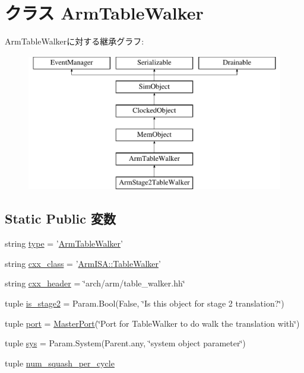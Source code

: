 \hypertarget{classArmTLB_1_1ArmTableWalker}{
\section{クラス ArmTableWalker}
\label{classArmTLB_1_1ArmTableWalker}
}
ArmTableWalkerに対する継承グラフ:\begin{figure}[H]
\begin{center}
\leavevmode
\includegraphics[height=6cm]{classArmTLB_1_1ArmTableWalker}
\end{center}
\end{figure}
\subsection*{Static Public 変数}
\begin{DoxyCompactItemize}
\item 
string \hyperlink{classArmTLB_1_1ArmTableWalker_acce15679d830831b0bbe8ebc2a60b2ca}{type} = '\hyperlink{classArmTLB_1_1ArmTableWalker}{ArmTableWalker}'
\item 
string \hyperlink{classArmTLB_1_1ArmTableWalker_a58cd55cd4023648e138237cfc0822ae3}{cxx\_\-class} = '\hyperlink{classArmISA_1_1TableWalker}{ArmISA::TableWalker}'
\item 
string \hyperlink{classArmTLB_1_1ArmTableWalker_a17da7064bc5c518791f0c891eff05fda}{cxx\_\-header} = \char`\"{}arch/arm/table\_\-walker.hh\char`\"{}
\item 
tuple \hyperlink{classArmTLB_1_1ArmTableWalker_a79c1ca5c107632a64c9583c96fbcc282}{is\_\-stage2} = Param.Bool(False, \char`\"{}Is this object for stage 2 translation?\char`\"{})
\item 
tuple \hyperlink{classArmTLB_1_1ArmTableWalker_a1aadf525515ecfcf662c2aa51a503763}{port} = \hyperlink{classm5_1_1params_1_1MasterPort}{MasterPort}(\char`\"{}Port for TableWalker to do walk the translation with\char`\"{})
\item 
tuple \hyperlink{classArmTLB_1_1ArmTableWalker_a1f27497e90bf86cc0b513e5c086c9e19}{sys} = Param.System(Parent.any, \char`\"{}system object parameter\char`\"{})
\item 
tuple \hyperlink{classArmTLB_1_1ArmTableWalker_a6fedb4107249699f51b624cf7677475c}{num\_\-squash\_\-per\_\-cycle}
\end{DoxyCompactItemize}


